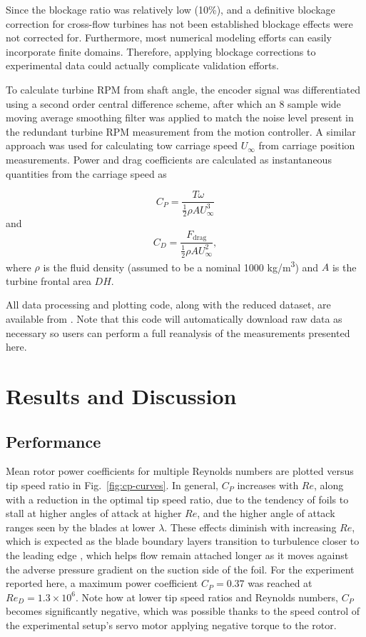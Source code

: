 \documentclass[10pt,letterpaper]{article}
\begin{document}
Since the blockage ratio was relatively low (10\%), and a definitive blockage
correction for cross-flow turbines has not been established \cite{Cavagnaro2014}
blockage effects were not corrected for. Furthermore, most numerical modeling
efforts can easily incorporate finite domains. Therefore, applying blockage
corrections to experimental data could actually complicate validation efforts.

To calculate turbine RPM from shaft angle, the encoder signal was differentiated
using a second order central difference scheme, after which an 8 sample wide
moving average smoothing filter was applied to match the noise level present in
the redundant turbine RPM measurement from the motion controller. A similar
approach was used for calculating tow carriage speed $U_\infty$ from carriage
position measurements. Power and drag coefficients are calculated as
instantaneous quantities from the carriage speed as

\begin{equation}
    C_P = \frac{T \omega}{\frac{1}{2} \rho A U_\infty^3}
\end{equation}
and
\begin{equation}
    C_D = \frac{F_\mathrm{drag}}{\frac{1}{2} \rho A U_\infty^2},
\end{equation}
where $\rho$ is the fluid density (assumed to be a nominal 1000
kg/m\textsuperscript{3}) and $A$ is the turbine frontal area $DH$.

All data processing and plotting code, along with the reduced dataset, are
available from \cite{Bachant2016-RM2-data}. Note that this code will
automatically download raw data as necessary so users can perform a full
reanalysis of the measurements presented here.


\section*{Results and Discussion}

\subsection*{Performance}

Mean rotor power coefficients for multiple Reynolds numbers are plotted versus
tip speed ratio in Fig.~\ref{fig:cp-curves}. In general, $C_P$ increases with
$Re$, along with a reduction in the optimal tip speed ratio, due to the tendency
of foils to stall at higher angles of attack at higher $Re$, and the higher
angle of attack ranges seen by the blades at lower $\lambda$. These effects
diminish with increasing $Re$, which is expected as the blade boundary layers
transition to turbulence closer to the leading edge \cite{Lissaman1983,
    McMasters1980, Bachant2016-RVAT-Re-dep}, which helps flow remain attached longer
as it moves against the adverse pressure gradient on the suction side of the
foil. For the experiment reported here, a maximum power coefficient $C_P=0.37$
was reached at $Re_D=1.3 \times 10^6$. Note how at lower tip speed ratios and
Reynolds numbers, $C_P$ becomes significantly negative, which was possible
thanks to the speed control of the experimental setup's servo motor applying
negative torque to the rotor.
\end{document}
